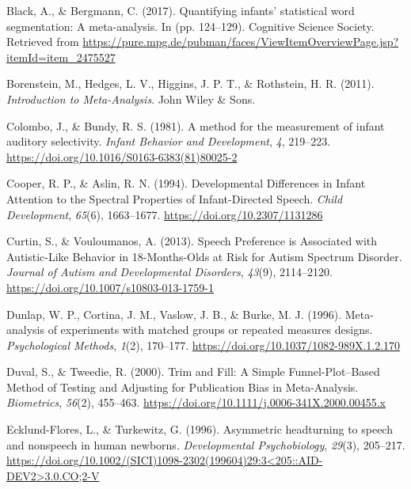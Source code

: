 \documentclass[man]{apa6}
\begin{document}
\leavevmode\hypertarget{ref-black_quantifying_2017}{}%
Black, A., \& Bergmann, C. (2017). Quantifying infants' statistical word segmentation: A meta-analysis. In (pp. 124--129). Cognitive Science Society. Retrieved from \url{https://pure.mpg.de/pubman/faces/ViewItemOverviewPage.jsp?itemId=item_2475527}

\leavevmode\hypertarget{ref-borenstein_introduction_2011}{}%
Borenstein, M., Hedges, L. V., Higgins, J. P. T., \& Rothstein, H. R. (2011). \emph{Introduction to Meta-Analysis}. John Wiley \& Sons.

\leavevmode\hypertarget{ref-colombo_method_1981}{}%
Colombo, J., \& Bundy, R. S. (1981). A method for the measurement of infant auditory selectivity. \emph{Infant Behavior and Development}, \emph{4}, 219--223. \url{https://doi.org/10.1016/S0163-6383(81)80025-2}

\leavevmode\hypertarget{ref-cooper_developmental_1994}{}%
Cooper, R. P., \& Aslin, R. N. (1994). Developmental Differences in Infant Attention to the Spectral Properties of Infant-Directed Speech. \emph{Child Development}, \emph{65}(6), 1663--1677. \url{https://doi.org/10.2307/1131286}

\leavevmode\hypertarget{ref-curtin_speech_2013}{}%
Curtin, S., \& Vouloumanos, A. (2013). Speech Preference is Associated with Autistic-Like Behavior in 18-Months-Olds at Risk for Autism Spectrum Disorder. \emph{Journal of Autism and Developmental Disorders}, \emph{43}(9), 2114--2120. \url{https://doi.org/10.1007/s10803-013-1759-1}

\leavevmode\hypertarget{ref-dunlap_meta-analysis_1996}{}%
Dunlap, W. P., Cortina, J. M., Vaslow, J. B., \& Burke, M. J. (1996). Meta-analysis of experiments with matched groups or repeated measures designs. \emph{Psychological Methods}, \emph{1}(2), 170--177. \url{https://doi.org/10.1037/1082-989X.1.2.170}

\leavevmode\hypertarget{ref-duval_trim_2000}{}%
Duval, S., \& Tweedie, R. (2000). Trim and Fill: A Simple Funnel-Plot--Based Method of Testing and Adjusting for Publication Bias in Meta-Analysis. \emph{Biometrics}, \emph{56}(2), 455--463. \url{https://doi.org/10.1111/j.0006-341X.2000.00455.x}

\leavevmode\hypertarget{ref-ecklund-flores_asymmetric_1996}{}%
Ecklund-Flores, L., \& Turkewitz, G. (1996). Asymmetric headturning to speech and nonspeech in human newborns. \emph{Developmental Psychobiology}, \emph{29}(3), 205--217. \href{https://doi.org/10.1002/(SICI)1098-2302(199604)29:3\%3C205::AID-DEV2\%3E3.0.CO;2-V}{https://doi.org/10.1002/(SICI)1098-2302(199604)29:3\textless{}205::AID-DEV2\textgreater{}3.0.CO;2-V}
\end{document}
